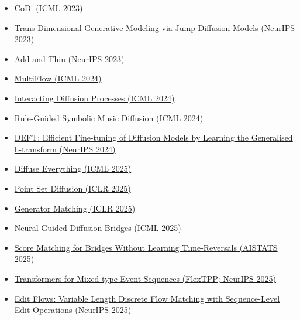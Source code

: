 \documentclass[11pt]{article}
\begin{document}
\begin{itemize}
\item \href{https://proceedings.mlr.press/v202/lee23i.html}{CoDi (ICML 2023)}
\item \href{https://papers.neurips.cc/paper_files/paper/2023/hash/83a10a480fbec91c88f6a9293b4d2b05-Abstract-Conference.html}{Trans-Dimensional Generative Modeling via Jump Diffusion Models (NeurIPS 2023)}
\item \href{https://papers.neurips.cc/paper_files/paper/2023/hash/b1d9c7e7bd265d81aae8d74a7a6bd7f1-Abstract-Conference.html}{Add and Thin (NeurIPS 2023)}
\item \href{https://proceedings.mlr.press/v235/campbell24a.html}{MultiFlow (ICML 2024)}
\item \href{https://proceedings.mlr.press/v235/zeng24f.html}{Interacting Diffusion Processes (ICML 2024)}
\item \href{https://proceedings.mlr.press/v235/huang24g.html}{Rule-Guided Symbolic Music Diffusion (ICML 2024)}
\item \href{https://proceedings.neurips.cc/paper_files/paper/2024/hash/22d258dfbdf840ccbf266bbc545dd95f-Abstract-Conference.html}{DEFT: Efficient Fine-tuning of Diffusion Models by Learning the Generalised h-transform (NeurIPS 2024)}
\item \href{https://openreview.net/forum?id=AjbiIcRt6q}{Diffuse Everything (ICML 2025)}
\item \href{https://proceedings.iclr.cc/paper_files/paper/2025/hash/cceb6b5d1781b6eb848f7e87bff5f74b-Abstract-Conference.html}{Point Set Diffusion (ICLR 2025)}
\item \href{https://proceedings.iclr.cc/paper_files/paper/2025/hash/819aaee144cb40e887a4aa9e781b1547-Abstract-Conference.html}{Generator Matching (ICLR 2025)}
\item \href{https://proceedings.mlr.press/v267/yang25af.html}{Neural Guided Diffusion Bridges (ICML 2025)}
\item \href{https://proceedings.mlr.press/v258/baker25a.html}{Score Matching for Bridges Without Learning Time-Reversals (AISTATS 2025)}
\item \href{https://papers.nips.cc/paper_files/paper/2025/hash/a6c7515ac435277dc92b75a07bb2257c-Abstract-Conference.html}{Transformers for Mixed-type Event Sequences (FlexTPP; NeurIPS 2025)}
\item \href{https://proceedings.neurips.cc/paper_files/paper/2025/hash/cb43f46154e750746602faaffd65fbbb-Abstract-Conference.html}{Edit Flows: Variable Length Discrete Flow Matching with Sequence-Level Edit Operations (NeurIPS 2025)}

\end{itemize}
\end{document}
